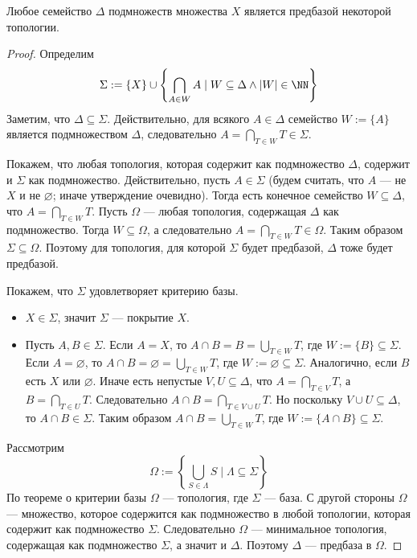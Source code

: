 \documentclass[12pt,a4paper]{article}
\begin{document}
    \begin{theorem}
        Любое семейство $\Delta$ подмножеств множества $X$ является предбазой некоторой топологии.
    \end{theorem}

    \begin{proof}
        Определим
        \[\Sigma := \{X\} \cup \left\{\bigcap_{A \in W} A \mid W \subseteq \Delta \wedge |W| \in \NN\right\}\]
        Заметим, что $\Delta \subseteq \Sigma$. Действительно, для всякого $A \in \Delta$ семейство $W := \{A\}$ является подмножеством $\Delta$, следовательно $A = \bigcap_{T \in W} T \in \Sigma$.

        Покажем, что любая топология, которая содержит как подмножество $\Delta$, содержит и $\Sigma$ как подмножество. Действительно, пусть $A \in \Sigma$ (будем считать, что $A$ --- не $X$ и не $\varnothing$; иначе утверждение очевидно). Тогда есть конечное семейство $W \subseteq \Delta$, что $A = \bigcap_{T \in W} T$. Пусть $\Omega$ --- любая топология, содержащая $\Delta$ как подмножество. Тогда $W \subseteq \Omega$, а следовательно $A = \bigcap_{T \in W} T \in \Omega$. Таким образом $\Sigma \subseteq \Omega$. Поэтому для топология, для которой $\Sigma$ будет предбазой, $\Delta$ тоже будет предбазой.

        Покажем, что $\Sigma$ удовлетворяет критерию базы.
        \begin{itemize}
            \item $X \in \Sigma$, значит $\Sigma$ --- покрытие $X$.
            \item Пусть $A, B \in \Sigma$. Если $A = X$, то $A \cap B = B = \bigcup_{T \in W} T$, где $W := \{B\} \subseteq \Sigma$. Если $A = \varnothing$, то $A \cap B = \varnothing = \bigcup_{T \in W} T$, где $W := \varnothing \subseteq \Sigma$. Аналогично, если $B$ есть $X$ или $\varnothing$. Иначе есть непустые $V, U \subseteq \Delta$, что $A = \bigcap_{T \in V} T$, а $B = \bigcap_{T \in U} T$. Следовательно $A \cap B = \bigcap_{T \in V \cup U} T$. Но поскольку $V \cup U \subseteq \Delta$, то $A \cap B \in \Sigma$. Таким образом $A \cap B = \bigcup_{T \in W} T$, где $W := \{A \cap B\} \subseteq \Sigma$.
        \end{itemize}

        Рассмотрим
        \[\Omega := \left\{\bigcup_{S \in \Lambda} S \mid \Lambda \subseteq \Sigma\right\}\]
        По теореме о критерии базы $\Omega$ --- топология, где $\Sigma$ --- база. С другой стороны $\Omega$ --- множество, которое содержится как подмножество в любой топологии, которая содержит как подмножество $\Sigma$. Следовательно $\Omega$ --- минимальное топология, содержащая как подмножество $\Sigma$, а значит и $\Delta$. Поэтому $\Delta$ --- предбаза в $\Omega$. 
    \end{proof}
\end{document}
